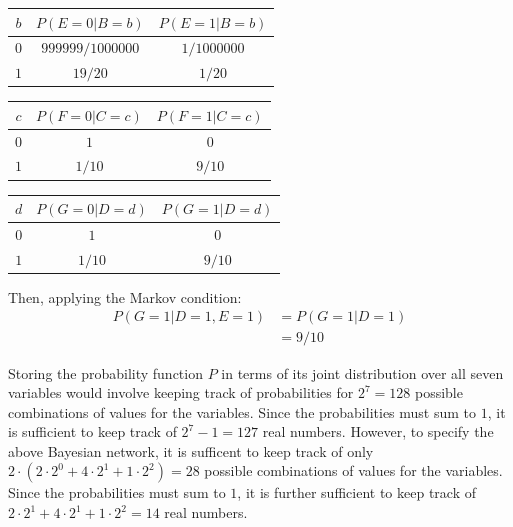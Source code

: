 \documentclass{article}
\begin{document}
\begin{center}
\begin{tabular}{|c|c|c|}
    \hline
    $b$ & $P(E = 0 | B = b)$ & $P(E = 1 | B = b)$ \\
    \hline
    $0$ & $999999/1000000$ & $1/1000000$ \\
    \hline
    $1$ & $19/20$ & $1/20$ \\
    \hline
\end{tabular}
\end{center}
\begin{center}
\begin{tabular}{|c|c|c|}
    \hline
    $c$ & $P(F = 0 | C = c)$ & $P(F = 1 | C = c)$ \\
    \hline
    $0$ & $1$ & $0$ \\
    \hline
    $1$ & $1/10$ & $9/10$ \\
    \hline
\end{tabular}
\end{center}
\begin{center}
\begin{tabular}{|c|c|c|}
    \hline
    $d$ & $P(G = 0 | D = d)$ & $P(G = 1 | D = d)$ \\
    \hline
    $0$ & $1$ & $0$ \\
    \hline
    $1$ & $1/10$ & $9/10$ \\
    \hline
\end{tabular}
\end{center}
Then, applying the Markov condition:
\begin{align*}
    P(G = 1 | D = 1, E = 1) & = P(G = 1 | D = 1) \\
    & = 9/10
\end{align*}

Storing the probability function $P$ in terms of its joint distribution over all seven variables would involve keeping track of probabilities for $2^7 = 128$ possible combinations of values for the variables. Since the probabilities must sum to $1$, it is sufficient to keep track of $2^7 - 1 = 127$ real numbers. However, to specify the above Bayesian network, it is sufficent to keep track of only $2 \cdot (2 \cdot 2^0 + 4 \cdot 2^1 + 1 \cdot 2^2) = 28$ possible combinations of values for the variables. Since the probabilities must sum to $1$, it is further sufficient to keep track of $2 \cdot 2^1 + 4 \cdot 2^1 + 1 \cdot 2^2 = 14$ real numbers.
\end{document}
